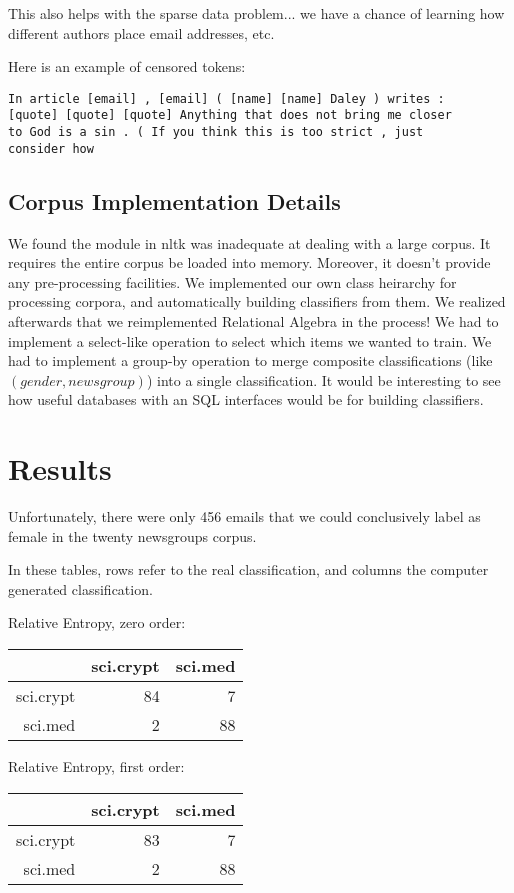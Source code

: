 \documentclass[a4]{article}
\begin{document}
This also helps with the sparse data problem... we have a chance of
learning how different authors place email addresses, etc.

Here is an example of censored tokens:

\begin{verbatim}
In article [email] , [email] ( [name] [name] Daley ) writes :
[quote] [quote] [quote] Anything that does not bring me closer
to God is a sin . ( If you think this is too strict , just
consider how
\end{verbatim}

\subsection{Corpus Implementation Details}
We found the  module in nltk was inadequate at dealing with a
large corpus.  It requires the entire corpus be loaded into memory.  Moreover,
it doesn't provide any pre-processing facilities.  We implemented our own
class heirarchy for processing corpora, and automatically building classifiers
from them.  We realized afterwards that we reimplemented Relational Algebra in
the process!  We had to implement a select-like operation to select which
items we wanted to train.  We had to implement a group-by operation to merge
composite classifications (like $(gender, newsgroup)$) into a single
classification.  It would be interesting to see how useful databases with an
SQL interfaces would be for building classifiers.

\section{Results}
Unfortunately, there were only 456 emails that we could conclusively
label as female in the twenty newsgroups corpus.

In these tables, rows refer to the real classification, and columns
the computer generated classification.

Relative Entropy, zero order:
\begin{center}
\begin{tabular}{|r|r|r|} \hline
		& sci.crypt	& sci.med \\ \hline
sci.crypt	& 84 		& 7 \\ \hline
sci.med		& 2		& 88 \\ \hline
\end{tabular}
\end{center}

Relative Entropy, first order:
\begin{center}
\begin{tabular}{|r|r|r|} \hline
		& sci.crypt	& sci.med \\ \hline
sci.crypt	& 83 		& 7 \\ \hline
sci.med		& 2		& 88 \\ \hline
\end{tabular}
\end{center}
\end{document}
